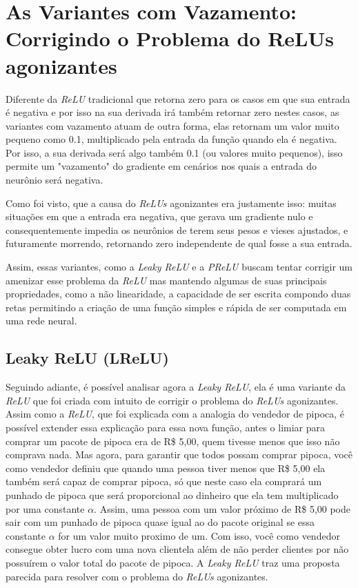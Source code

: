 \section{As Variantes com Vazamento: Corrigindo o Problema do ReLUs agonizantes}

Diferente da \textit{ReLU} tradicional que retorna zero para os casos em que sua entrada é negativa e por isso na sua derivada irá também retornar zero nestes casos, as variantes com vazamento atuam de outra forma, elas retornam um valor muito pequeno como 0.1, multiplicado pela entrada da função quando ela é negativa. Por isso, a sua derivada será algo também 0.1 (ou valores muito pequenos), isso permite um "vazamento" do gradiente em cenários nos quais a entrada do neurônio será negativa.

Como foi visto, que a causa do \textit{ReLUs} agonizantes era justamente isso: muitas situações em que a entrada era negativa, que gerava um gradiente nulo e consequentemente impedia os neurônios de terem seus pesos e vieses ajustados, e futuramente morrendo, retornando zero independente de qual fosse a sua entrada.

Assim, essas variantes, como a \textit{Leaky ReLU} e a \textit{PReLU} buscam tentar corrigir um amenizar esse problema da \textit{ReLU} mas mantendo algumas de suas principais propriedades, como a não linearidade, a capacidade de ser escrita compondo duas retas permitindo a criação de uma função simples e rápida de ser computada em uma rede neural.

\subsection{Leaky ReLU (LReLU)}

Seguindo adiante, é possível analisar agora a \textit{Leaky ReLU}, ela é uma variante da \textit{ReLU} que foi criada com intuito de corrigir o problema do \textit{ReLUs} agonizantes. Assim como a \textit{ReLU}, que foi explicada com a analogia do vendedor de pipoca, é possível extender essa explicação para essa nova função, antes o limiar para comprar um pacote de pipoca era de R\$ 5,00, quem tivesse menos que isso não comprava nada. Mas agora, para garantir que todos possam comprar pipoca, você como vendedor definiu que quando uma pessoa tiver menos que R\$ 5,00 ela também será capaz de comprar pipoca, só que neste caso ela comprará um punhado de pipoca que será proporcional ao dinheiro que ela tem multiplicado por uma constante $\alpha$. Assim, uma pessoa com um valor próximo de R\$ 5,00 pode sair com um punhado de pipoca quase igual ao do pacote original se essa constante $\alpha$ for um valor muito proximo de um. Com isso, você como vendedor consegue obter lucro com uma nova clientela além de não perder clientes por não possuírem o valor total do pacote de pipoca. A \textit{Leaky ReLU} traz uma proposta parecida para resolver com o problema do \textit{ReLUs} agonizantes.

